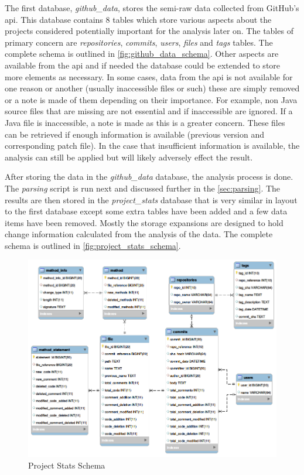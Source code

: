 The first database, \textit{github\_data}, stores the semi-raw data collected from GitHub's \gls{api}. This database contains 8 tables which store various aspects about the projects considered potentially important for the analysis later on. The tables of primary concern are \textit{repositories}, \textit{commits}, \textit{users}, \textit{files} and \textit{tags} tables. The complete schema is outlined in \autoref{fig:github_data_schema}. Other aspects are available from the \gls{api} and if needed the database could be extended to store more elements as necessary. In some cases, data from the \gls{api} is not available for one reason or another (usually inaccessible files or such) these are simply removed or a note is made of them depending on their importance. For example, non Java source files that are missing are not essential and if inaccessible are ignored. If a Java file is inaccessible, a note is made as this is a greater concern. These files can be retrieved if enough information is available (previous version and corresponding patch file). In the case that insufficient information is available, the analysis can still be applied but will likely adversely effect the result.

After storing the data in the \textit{github\_data} database, the analysis process is done. The \textit{parsing} script is run next and discussed further in the \autoref{sec:parsing}. The results are then stored in the \textit{project\_stats} database that is very similar in layout to the first database except some extra tables have been added and a few data items have been removed. Mostly the storage expansions are designed to hold change information calculated from the analysis of the data. The complete schema is outlined in \autoref{fig:project_stats_schema}.

\begin{figure}[!ht]
    \centering
        \includegraphics[width=1.0\textwidth]{images/project_stats_schema}
    \caption{Project Stats Schema}
    \label{fig:project_stats_schema}
\end{figure}

